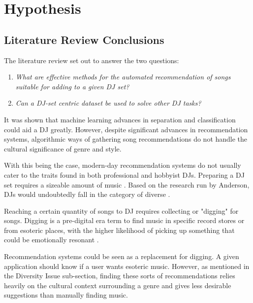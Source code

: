 
\graphicspath{{Chapter4/}}

\chapter{Hypothesis}

\section{Literature Review Conclusions}

The literature review set out to answer the two questions:

\begin{enumerate}
	\item \textit{What are effective methods for the automated recommendation of songs suitable for adding to a given DJ set?}
	
	\item \textit{Can a DJ-set centric dataset be used to solve other DJ tasks?}
\end{enumerate}

It was shown that machine learning advances in separation and classification could aid a DJ greatly. However, despite significant advances in recommendation systems, algorithmic ways of gathering song recommendations do not handle the cultural significance of genre and style.

With this being the case, modern-day recommendation systems do not usually cater to the traits found in both professional and hobbyist DJs. Preparing a DJ set requires a sizeable amount of music \citep{allen_djs_2021}. Based on the research run by Anderson, DJs would undoubtedly fall in the category of diverse \citep{anderson_algorithmic_2020}.

Reaching a certain quantity of songs to DJ requires collecting or "digging" for songs. Digging is a pre-digital era term to find music in specific record stores or from esoteric places, with the higher likelihood of picking up something that could be emotionally resonant \citep{allen_djs_2021}.

Recommendation systems could be seen as a replacement for digging. A given application should know if a user wants esoteric music. However, as mentioned in the Diversity Issue sub-section, finding these sorts of recommendations relies heavily on the cultural context surrounding a genre and gives less desirable suggestions than manually finding music. 

